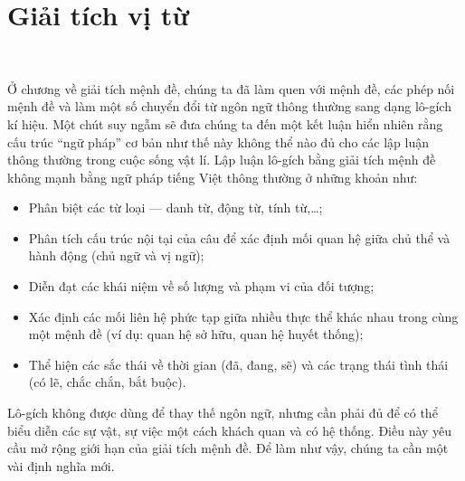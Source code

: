 \chapter{Giải tích vị từ}

\ %

Ở chương về giải tích mệnh đề, chúng ta đã làm quen với mệnh đề, các phép nối mệnh đề và làm một số chuyển đổi từ ngôn ngữ thông thường sang dạng lô-gích kí hiệu. Một chút suy ngẫm sẽ đưa chúng ta đến một kết luận hiển nhiên rằng cấu trúc ``ngữ pháp'' cơ bản như thế này không thể nào đủ cho các lập luận thông thường trong cuộc sống vật lí. Lập luận lô-gích bằng giải tích mệnh đề không mạnh bằng ngữ pháp tiếng Việt thông thường ở những khoản như:
\begin{itemize}
    \item Phân biệt các từ loại --- danh từ, động từ, tính từ,\dots;
    \item Phân tích cấu trúc nội tại của câu để xác định mối quan hệ giữa chủ thể và hành động (chủ ngữ và vị ngữ);
    \item Diễn đạt các khái niệm về số lượng và phạm vi của đối tượng;
    \item Xác định các mối liên hệ phức tạp giữa nhiều thực thể khác nhau trong cùng một mệnh đề (ví dụ: quan hệ sở hữu, quan hệ huyết thống);
    \item Thể hiện các sắc thái về thời gian (đã, đang, sẽ) và các trạng thái tình thái (có lẽ, chắc chắn, bắt buộc).
\end{itemize}
Lô-gích không được dùng để thay thế ngôn ngữ, nhưng cần phải đủ để có thể biểu diễn các sự vật, sự việc một cách khách quan và có hệ thống. Điều này yêu cầu mở rộng giới hạn của giải tích mệnh đề. Để làm như vậy, chúng ta cần một vài định nghĩa mới.



